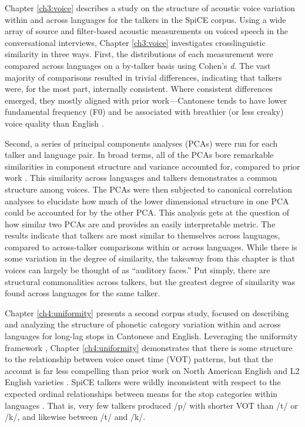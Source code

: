 Chapter \ref{ch3:voice} describes a study on the structure of acoustic voice variation within and across languages for the talkers in the SpiCE corpus. Using a wide array of source and filter-based acoustic measurements on voiced speech in the conversational interviews, Chapter \ref{ch3:voice} investigates crosslinguistic similarity in three ways. First, the distributions of each measurement were compared across languages on a by-talker basis using Cohen's \textit{d}. The vast majority of comparisons resulted in trivial differences, indicating that talkers were, for the most part, internally consistent. Where consistent differences emerged, they mostly aligned with prior work---Cantonese tends to have lower fundamental frequency (F0) and be associated with breathier (or less creaky) voice quality than English \citep{ng_2012_ltas}. 

Second, a series of principal components analyses (PCAs) were run for each talker and language pair. In broad terms, all of the PCAs bore remarkable similarities in component structure and variance accounted for, compared to prior work \citep{lee_2019_acoustic, lee_2019_spontaneous, lee_2020_language}. This similarity across languages and talkers demonstrates a common structure among voices. The PCAs were then subjected to canonical correlation analyses to elucidate how much of the lower dimensional structure in one PCA could be accounted for by the other PCA. This analysis gets at the question of how similar two PCAs are and provides an easily interpretable metric. The results indicate that talkers are most similar to themselves across languages, compared to across-talker comparisons within or across languages. While there is some variation in the degree of similarity, the takeaway from this chapter is that voices can largely be thought of as ``auditory faces.'' Put simply, there are structural commonalities across talkers, but the greatest degree of similarity was found across languages for the same talker. 

Chapter \ref{ch4:uniformity} presents a second corpus study, focused on describing and analyzing the structure of phonetic category variation within and across languages for long-lag stops in Cantonese and English. Leveraging the uniformity framework \citep{chodroff_2017_structure}, Chapter \ref{ch4:uniformity} demonstrates that there is some structure to the relationship between voice onset time (VOT) patterns, but that the account is far less compelling than prior work on North American English \citep{chodroff_2017_structure} and L2 English varieties \citep{chodroff_2019_l2}. SpiCE talkers were wildly inconsistent with respect to the expected ordinal relationships between means for the stop categories within languages \citep{chodroff_2017_structure, cho_1999_vot, lisker_1964_vot}. That is, very few talkers produced /p/ with shorter VOT than /t/ or /k/, and likewise between /t/ and /k/. 

